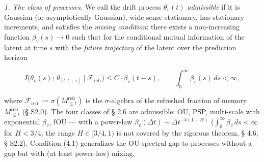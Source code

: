 \documentclass[12pt]{iopart}
\begin{document}
\emph{1. The class of processes.} We call the drift process \(\theta_v(t)\) \emph{admissible} if it is Gaussian (or asymptotically Gaussian), wide-sense stationary, has stationary increments, and satisfies the \emph{mixing condition}: there exists a non-increasing function \(\beta_v(s) \to 0\) such that for the conditional mutual information of the latent at time \(s\) with the \emph{future trajectory} of the latent over the prediction horizon



\begin{equation}I\big(\theta_v(s);\, \theta_{[t,t+\tau]} \mid \mathcal F_{\text{refr}}\big) \le C\cdot\beta_v(t-s), \qquad \int_0^\infty \beta_v(s)\,ds < \infty, \tag{4.1}\end{equation}



where \(\mathcal F_{\text{refr}} := \sigma(M_{\le t}^{\text{refr}})\) is the \(\sigma\)-algebra of the refreshed fraction of memory \(M_{\le t}^{\text{refr}}\) (§ S2.0). The four classes of § 2.6 are admissible: OU, PSP, multi-scale with exponential \(\beta_v\), fOU --- with a power-law \(\beta_v(\Delta t)\sim\Delta t^{-4(1-H)}\) (\(\int_0^\infty\beta_v\,ds < \infty\) for \(H < 3/4\); the range \(H\in[3/4,1)\) is not covered by the rigorous theorem, § 4.6, § S2.2). Condition (4.1) generalizes the OU spectral gap \cite{Andriishin2026b,Pavliotis2014} to processes without a gap but with (at least power-law) mixing.
\end{document}
